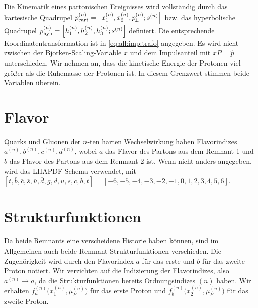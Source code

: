 Die Kinematik eines partonischen Ereignisses wird vollständig durch das kartesische Quadrupel $p_{\operatorname{cart}}^{(n)}=\left[x_1^{(n)},x_2^{(n)},p_{\!\perp}^{(n)};s^{(n)}\right]$ bzw. das hyperbolische Quadrupel $p_{\operatorname{hyp}}^{(n)}=\left[h_1^{(n)},h_2^{(n)},h_3^{(n)};s^{(n)}\right]$ definiert. Die entsprechende Koordinatentransformation ist in \eqref{eq:all:imp:trafo} angegeben. Es wird nicht zwischen der Bjorken-Scaling-Variable $x$ und dem Impulsanteil mit $xP=\hat{p}$ unterschieden. Wir nehmen an, dass die kinetische Energie der Protonen viel größer als die Ruhemasse der Protonen ist. In diesem Grenzwert stimmen beide Variablen überein.
\section{Flavor}
Quarks und Gluonen der $n$-ten harten Wechselwirkung haben Flavorindizes $a^{(n)}, b^{(n)},c^{(n)},d^{(n)}$, wobei $a$ das Flavor des Partons aus dem Remnant 1 und $b$ das Flavor des Partons aus dem Remnant 2 ist. Wenn nicht anders angegeben, wird das LHAPDF-Schema verwendet, mit $[\overline{t},\overline{b},\overline{c},\overline{s},\overline{u},\overline{d},g,d,u,s,c,b,t]=[-6,-5,-4,-3,-2,-1,0,1,2,3,4,5,6]$. 
\section{Strukturfunktionen}

Da beide Remnants eine verscheidene Historie haben können, sind im Allgemeinen auch beide Remnant-Strukturfunktionen verschieden. Die Zugehörigkeit wird durch den Flavorindex $a$ für das erste und $b$ für das zweite Proton notiert. Wir verzichten auf die Indizierung der Flavorindizes, also $a^{(n)}\rightarrow a$, da die Strukturfunktionen bereits Ordnungsindizes ${(n)}$ haben. Wir erhalten $f_a^{(n)}\big(x_1^{(n)},\mu_F^{(n)}\big)$ für das erste Proton und $f_b^{(n)}\big(x_2^{(n)},\mu_F^{(n)}\big)$ für das zweite Proton.


